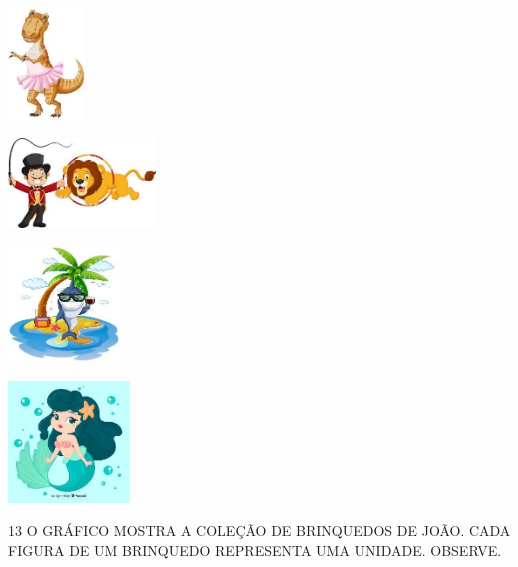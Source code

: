 \begin{escolha}
\item \includegraphics[width=0.80601in,height=1.16259in]{media/image115.jpg}

\item \includegraphics[width=1.54211in,height=0.93118in]{media/image116.jpg}

\item \includegraphics[width=1.16834in,height=1.20694in]{media/image117.jpg}

\item \includegraphics[width=1.27083in,height=1.27083in]{media/image118.jpg}
\end{escolha}




\num{13} O GRÁFICO MOSTRA A COLEÇÃO DE BRINQUEDOS DE JOÃO. CADA FIGURA DE UM
BRINQUEDO REPRESENTA UMA UNIDADE. OBSERVE.


